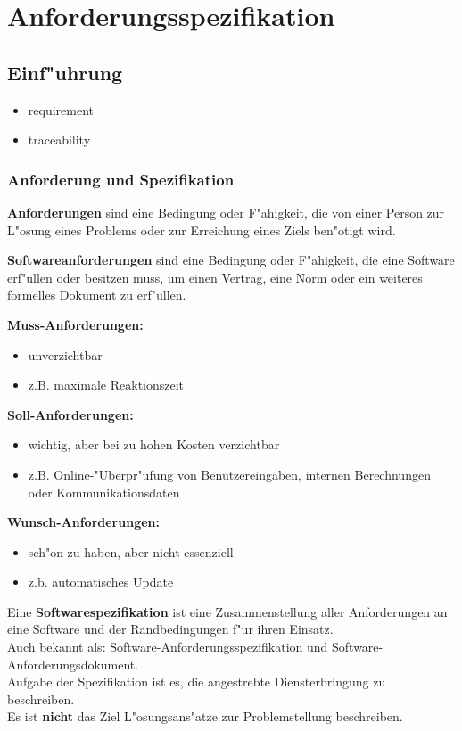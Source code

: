 
\section{Anforderungsspezifikation}


\subsection{Einf"uhrung}


\begin{itemize}
    \item requirement
    \item traceability
\end{itemize}


\subsubsection{Anforderung und Spezifikation}

\textbf{Anforderungen} sind eine Bedingung oder F"ahigkeit, die von einer Person zur L"osung eines Problems oder zur Erreichung eines Ziels ben"otigt wird.

\textbf{Softwareanforderungen} sind eine Bedingung oder F"ahigkeit, die eine Software erf"ullen oder besitzen muss, um einen Vertrag, eine Norm oder ein weiteres formelles Dokument zu erf"ullen.


\textbf{Muss-Anforderungen:}
\begin{itemize}
    \item unverzichtbar
    \item z.B. maximale Reaktionszeit
\end{itemize}

\textbf{Soll-Anforderungen:}
\begin{itemize}
    \item wichtig, aber bei zu hohen Kosten verzichtbar
    \item z.B. Online-"Uberpr"ufung von Benutzereingaben, internen Berechnungen oder Kommunikationsdaten
\end{itemize}

\textbf{Wunsch-Anforderungen:}
\begin{itemize}
    \item sch"on zu haben, aber nicht essenziell
    \item z.b. automatisches Update
\end{itemize}


Eine \textbf{Softwarespezifikation} ist eine Zusammenstellung aller Anforderungen an eine Software und der Randbedingungen f"ur ihren Einsatz.\\
Auch bekannt als: Software-Anforderungsspezifikation und Software-Anforderungsdokument.\\
Aufgabe der Spezifikation ist es, die angestrebte Diensterbringung zu beschreiben.\\
Es ist \textbf{nicht} das Ziel L"osungsans"atze zur Problemstellung beschreiben.

